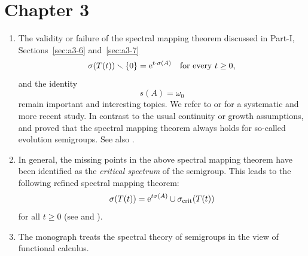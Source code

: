 \section*{Chapter 3}
\begin{enumerate} 

\item
The validity or failure of the spectral mapping theorem discussed in Part-I, Sections~\ref{sec:a3-6} and~\ref{sec:a3-7} 
\[
\sigma(T(t)) \setminus \{0\} = \eu^{t \cdot \sigma(A)} \quad \text{for every $t \geq 0$,}
\]
and the identity 
\[
s(A) = \omega_{0}
\]
remain important and interesting topics.
We refer to \textcite[Section 2]{zbmath00921898} or \textcite[Chapter IV]{zbmath01354832} for a systematic and more recent study. 
In contrast to the usual continuity or growth assumptions, 
\textcite[]{zbmath00763985} and \textcite[]{zbmath00858476}
proved that the spectral mapping theorem always holds for so-called evolution semigroups.
See also \textcite[Chapter VI, Theorem 9.18]{zbmath01354832}.

\item 
In general, the missing points in the above spectral mapping theorem have been 
identified as the \emph{critical spectrum} of the semigroup. 
This leads to the 
following refined spectral mapping theorem:
\[
    \sigma(T(t)) = 
        \mathrm{e}^{t \sigma(A)} \cup \sigma_{\text{crit}}(T(t)) 
\]
for all $t \geq 0$ (see \textcite{zbmath01496433} and \textcite{zbmath01484683}).

\item
The monograph \textcite{zbmath05030449} treats the spectral theory of semigroups in the view of functional calculus.

\end{enumerate}
